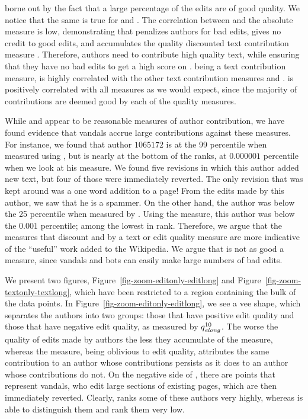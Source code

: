 borne out by the fact that a large percentage of the edits are of
good quality.
We notice that the same is true for \textlong and \textonly.
The correlation between \punish and the absolute measure
\editonly is low, demonstrating that \punish
penalizes authors for bad edits, gives no credit to good edits,
and accumulates the quality discounted text contribution measure
\textlong.
Therefore, authors need to contribute high quality text, while
ensuring that they have no bad edits to get a high score on
\punish.
\tenrevs being a text contribution measure, is highly correlated
with the other text contribution measures \textonly and
\textlong.
\numedits is positively correlated with all measures as we would
expect, since the majority of contributions are deemed good by
each of the quality measures.

While \textonly and \editonly appear to be reasonable measures
of author contribution, we have found evidence that vandals
accrue large contributions against these measures.
For instance, we found that author $1065172$ is at the 99
percentile when measured using \textonly, but is nearly at the
bottom of the ranks, at $0.000001$ percentile when we look at his
\punish measure.
We found five revisions in which this author added new text, but
four of those were immediately reverted.
The only revision that was kept around was a one word addition to a
page!
From the edits made by this author, we saw that he is a spammer.
On the other hand, the author was below the 25
percentile when measured by \textlong.
Using the \editlong measure, this author was below the
$0.001$ percentile; among the lowest in rank.
Therefore, we argue that the measures that discount \textonly and
\editonly by a text or edit quality measure are more indicative
of the ``useful'' work added to the Wikipedia.
We argue that \numedits is not as good a measure, since
vandals and bots can easily make large numbers of bad edits.

We present two figures, Figure~\ref{fig-zoom-editonly-editlong}
and Figure~\ref{fig-zoom-textonly-textlong},
which have been restricted to a region containing the
bulk of the data points.
In Figure~\ref{fig-zoom-editonly-editlong},
we see a vee shape, which separates the authors into
two groups: those that have positive edit quality and those
that have negative edit quality, as measured by $\quality{elong}{10}{}$.
The worse the quality of edits made by authors the less they
accumulate of the \editlong measure, whereas the \editonly
measure, being oblivious to edit quality, attributes the same
contribution to an author whose contributions persists as it
does to an author whose contributions do not.
On the negative side of \editlong, there are points that represent
vandals, who edit large sections of existing pages, which are
then immediately reverted.
Clearly, \editonly ranks some of these authors very highly,
whereas \editlong is able to distinguish them and rank
them very low.

